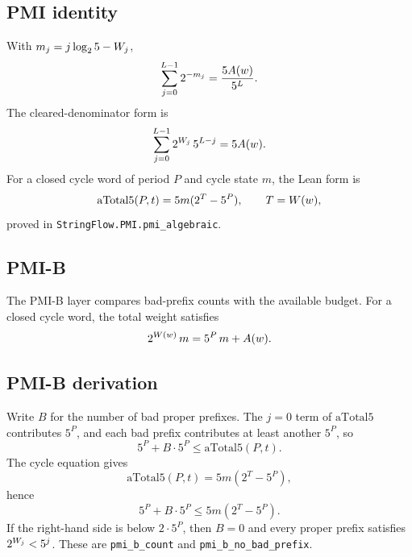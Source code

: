 \subsection{PMI identity}

With $m_j=j\log_2 5-W_j$,
\begin{equation*}
  \sum_{j=0}^{L-1}2^{-m_j}
    =\frac{5A(w)}{5^L}.
\end{equation*}
The cleared-denominator form is
\begin{equation*}
  \sum_{j=0}^{L-1}2^{W_j}\,5^{L-j}
    =5A(w).
\end{equation*}
For a closed cycle word of period $P$ and cycle state $m$, the Lean
form is
\begin{equation*}
  \mathrm{aTotal5}(P,t)=5m(2^T-5^P),
\qquad T=W(w),
\end{equation*}
proved in \texttt{StringFlow.PMI.pmi\_algebraic}.

\subsection{PMI-B}

The PMI-B layer compares bad-prefix counts with the available budget.
For a closed cycle word, the total weight satisfies
\begin{equation*}
  2^{W(w)}\,m=5^P\,m+A(w).
\end{equation*}

\subsection{PMI-B derivation}

Write $B$ for the number of bad proper prefixes.  The $j=0$ term of
$\mathrm{aTotal5}$ contributes $5^P$, and each bad prefix contributes
at least another $5^P$, so
\begin{equation*}
  5^P+B\cdot5^P\le\mathrm{aTotal5}(P,t).
\end{equation*}
The cycle equation gives
\begin{equation*}
  \mathrm{aTotal5}(P,t)=5m(2^T-5^P),
\end{equation*}
hence
\begin{equation*}
  5^P+B\cdot5^P\le5m(2^T-5^P).
\end{equation*}
If the right-hand side is below $2\cdot5^P$, then $B=0$ and every
proper prefix satisfies $2^{W_j}<5^j$.  These are
\texttt{pmi\_b\_count} and \texttt{pmi\_b\_no\_bad\_prefix}.

